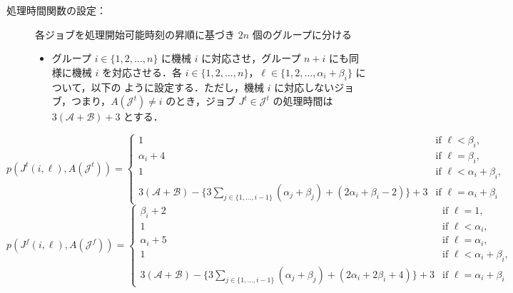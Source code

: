 \documentclass[12pt]{optlab-bachelor}
\begin{document}
\begin{description}
  \item[処理時間関数の設定：] 各ジョブを処理開始可能時刻の昇順に基づき $2n$ 個のグループに分ける
  \begin{itemize}
    \item グループ $i \in \{1,2,\ldots,n\}$ に機械 $i$ に対応させ，グループ
    $n + i$ にも同様に機械 $i$ を対応させる．各 $i \in \{1,2,\ldots,
    n\}$，$\ell \in \{1,2,\ldots, \alpha_i + \beta_i\}$ について，以下の
    ように設定する．ただし，機械 $i$ に対応しないジョブ，つまり，$A(\mathcal{J}^t)  \neq i$ のとき，ジョブ $J^t \in \mathcal{J}^t$ の処理時間は $3(\mathcal{A} + \mathcal{B}) + 3$ とする．
  \end{itemize}
\end{description}
{\small
$$p(J^t(i,\ell), A(\mathcal{J}^t)) =
\left\{ \begin{array}{lllll} 1 & \text{if } \ell < \beta_i, \\
\alpha_i + 4 & \text{if } \ell = \beta_i,\\ 1 & \text{if } \ell < \alpha_i + \beta_i, \\
3(\mathcal{A} + \mathcal{B}) - \big\{ 3\displaystyle \sum_{j \in
\{1,\ldots,i - 1\}}(\alpha_j + \beta_j) + (2\alpha_i +
\beta_i - 2)\big \} + 3 & \text{if } \ell = \alpha_i +
\beta_i \end{array} \right.$$
}
{\small
$$p(J^f(i,\ell),A(\mathcal{J}^f)) = \left\{ \begin{array}{lllll}
\beta_i + 2 & \text{if } \ell = 1, \\
1 & \text{if } \ell < \alpha_i, \\ \alpha_i
+ 5 & \text{if } \ell = \alpha_i , \\ 1 & \text{if } \ell < \alpha_i + \beta_i, \\ 3(\mathcal{A} + \mathcal{B}) -
\big\{ 3\displaystyle \sum_{j \in \{1,\ldots,i - 1\}}(\alpha_j + \beta_j)
+ (2\alpha_i + 2\beta_i + 4)\big \} + 3 & \text{if }
\ell = \alpha_i + \beta_i \end{array} \right.$$
}
\end{document}
